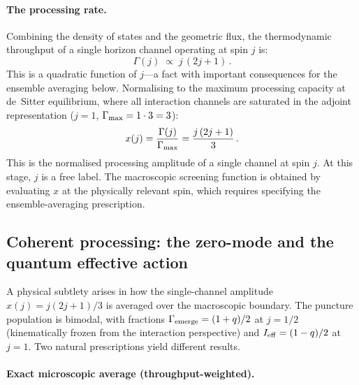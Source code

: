 \documentclass[aps,prd,twocolumn,10pt,superscriptaddress,nofootinbib]{revtex4-2}
\begin{document}
\paragraph{The processing rate.}

Combining the density of states and the geometric flux, the
thermodynamic throughput of a single horizon channel operating at
spin $j$ is:
\begin{equation}
\Gamma(j) \;\propto\; j\,(2j+1)\,.
\label{eq:Gamma_j_explicit}
\end{equation}
This is a quadratic function of $j$---a fact with important
consequences for the ensemble averaging below.  Normalising to the
maximum processing capacity at de~Sitter equilibrium, where all
interaction channels are saturated in the adjoint representation
($j = 1$, $\Gamma_{\rm max} = 1 \cdot 3 = 3$):
\begin{equation}
x(j) = \frac{\Gamma(j)}{\Gamma_{\rm max}}
  = \frac{j\,(2j+1)}{3}\,.
\label{eq:x_j}
\end{equation}
This is the normalised processing amplitude of a single channel
at spin $j$.  At this stage, $j$ is a free label.  The
macroscopic screening function is obtained by evaluating $x$ at
the physically relevant spin, which requires specifying the
ensemble-averaging prescription.


\subsection{Coherent processing: the zero-mode and the quantum
effective action}
\label{sec:mean_field}

A physical subtlety arises in how the single-channel amplitude
$x(j) = j(2j+1)/3$ is averaged over the macroscopic boundary.
The puncture population is bimodal, with fractions
$\Gamma_{\rm emerge} = (1+q)/2$ at $j = 1/2$ (kinematically
frozen from the interaction perspective) and
$I_{\rm eff} = (1-q)/2$ at $j = 1$.  Two natural prescriptions
yield different results.

\paragraph{Exact microscopic average (throughput-weighted).}
\end{document}
